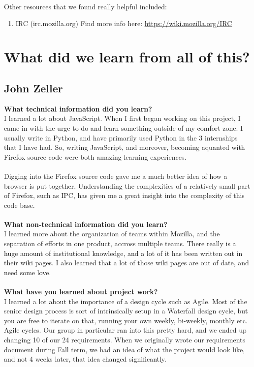 \documentclass[12pt]{article}
\begin{document}
\noindent Other resources that we found really helpful included:
\begin{enumerate}
	\item IRC (irc.mozilla.org)
		\subitem Find more info here: \href{https://wiki.mozilla.org/IRC}{https://wiki.mozilla.org/IRC}
\end{enumerate}
\pagebreak

\section{What did we learn from all of this?}
\subsection{John Zeller}
\textbf{What technical information did you learn?}\\
I learned a lot about JavaScript. When I first began working on this project, I came in with the urge to do and learn something outside of my comfort zone. I usually write in Python, and have primarily used Python in the 3 internships that I have had. So, writing JavaScript, and moreover, becoming aquanted with Firefox source code were both amazing learning experiences.
\\\\
Digging into the Firefox source code gave me a much better idea of how a browser is put together. Understanding the complexities of a relatively small part of Firefox, such as IPC, has given me a great insight into the complexity of this code base.
\\\\
\textbf{What non-technical information did you learn?}\\
I learned more about the organization of teams within Mozilla, and the separation of efforts in one product, accross multiple teams. There really is a huge amount of institutional knowledge, and a lot of it has been written out in their wiki pages. I also learned that a lot of those wiki pages are out of date, and need some love.
\\\\
\textbf{What have you learned about project work?}\\
I learned a lot about the importance of a design cycle such as Agile. Most of the senior design process is sort of intrinsically setup in a Waterfall design cycle, but you are free to iterate on that, running your own weekly, bi-weekly, monthly etc. Agile cycles. Our group in particular ran into this pretty hard, and we ended up changing 10 of our 24 requirements. When we originally wrote our requirements document during Fall term, we had an idea of what the project would look like, and not 4 weeks later, that idea changed significantly.
\end{document}
